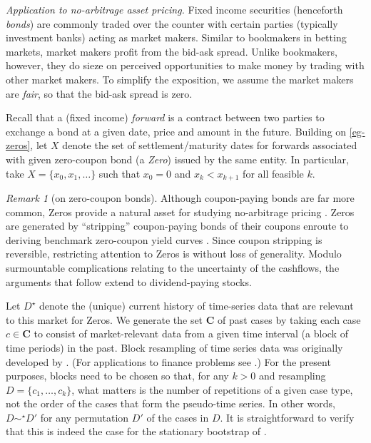 \documentclass[ecta,nameyear,draft]{econsocart}
\newcommand{\mbbc}{{\mathbf C}}
\newcommand{\past}{{D^\star}}
\theoremstyle{plain}
\theoremstyle{remark}
\newtheorem*{remark*}{Remark}
\newcounter{word}
\begin{document}
\emph{Application to no-arbitrage asset pricing.} %
Fixed income securities (henceforth \emph{bonds}) are commonly traded over the
counter with certain parties (typically investment banks) acting as market
makers. Similar to bookmakers in betting markets, market makers profit from the
bid-ask spread. Unlike bookmakers, however, they do sieze on perceived
opportunities to make money by trading with other market makers. To simplify
the exposition, we assume the market makers are \emph{fair}, so that the
bid-ask spread is zero.

Recall that a (fixed income) \emph{forward} is a contract between two parties
to exchange a bond at a given date, price and amount in the future.  Building
on \cref{eg-zeros}, let $X$ denote the set of settlement/maturity dates for
forwards associated with given zero-coupon bond (a \emph{Zero}) issued by the
same entity. In particular, take $X = \{x_0, x_1, \dots\}$ such that $x_0 = 0$
and $x_k < x_{k + 1}$ for all feasible $k$. 
\begin{remark*}[on zero-coupon bonds] Although coupon-paying bonds are far more
  common, Zeros provide a natural asset for studying no-arbitrage pricing
  \citep{barillas2019speculation}. Zeros are generated by ``stripping''
  coupon-paying bonds of their coupons enroute to deriving benchmark
  zero-coupon yield curves \citep{brealey2020principles}. Since coupon
  stripping is reversible, restricting attention to Zeros is without loss of
  generality. Modulo surmountable complications relating to the uncertainty of
  the cashflows, the arguments that follow extend to dividend-paying stocks.
\end{remark*}

Let $\past$ denote the (unique) current history of time-series data that are
relevant to this market for Zeros.  We generate the set $\mbbc$ of past cases
by taking each case $c \in \mbbc$ to consist of market-relevant data from a
given time interval (a block of time periods) in the past. Block resampling of
time series data was originally developed by
\citet{kunsch1989jackknife,politis1994stationary}. (For applications to finance
problems see \citet{white2000reality,harvey2021lucky}.) For the present
purposes, blocks need to be chosen so that, for any $k > 0$ and resampling $D =
\{c_1, \dots, c_k\}$, what matters is the number of repetitions of a given case
type, not the order of the cases that form the pseudo-time series. In other
words, $D \sim^\star D'$ for any permutation $D'$ of the cases in $D$.  It is
straightforward to verify that this is indeed the case for the stationary
bootstrap of \citet[section 2]{politis1994stationary}.
\end{document}
